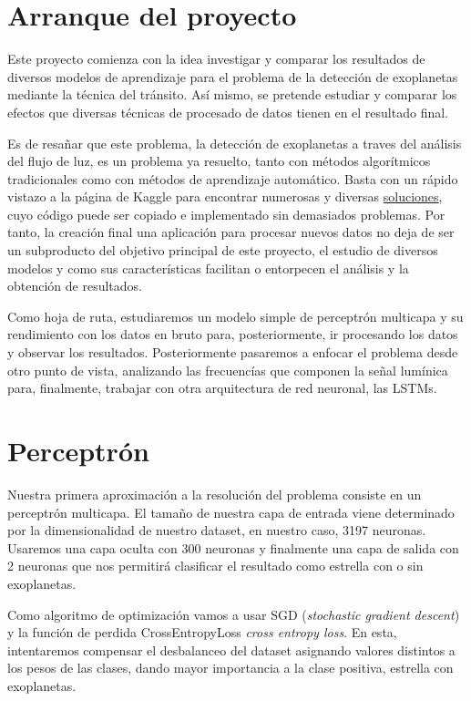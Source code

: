 
\section{Arranque del proyecto}

Este proyecto comienza con la idea investigar y comparar los resultados de diversos modelos de aprendizaje para el problema de la detección de exoplanetas mediante la técnica del tránsito. Así mismo, se pretende estudiar y comparar los efectos que diversas técnicas de procesado de datos tienen en el resultado final.

Es de resañar que este problema, la detección de exoplanetas a traves del análisis del flujo de luz, es un problema ya resuelto, tanto con métodos algorítmicos tradicionales como con métodos de aprendizaje automático. Basta con un rápido vistazo a la página de Kaggle para encontrar numerosas y diversas \href{https://www.kaggle.com/keplersmachines/kepler-labelled-time-series-data/kernels}{soluciones}, cuyo código puede ser copiado e implementado sin demasiados problemas. Por tanto, la creación final una aplicación para procesar nuevos datos no deja de ser un subproducto del objetivo principal de este proyecto, el estudio de diversos modelos y como sus características facilitan o entorpecen el análisis y la obtención de resultados.

Como hoja de ruta, estudiaremos un modelo simple de perceptrón multicapa y su rendimiento con los datos en bruto para, posteriormente, ir procesando los datos y observar los resultados. Posteriormente pasaremos a enfocar el problema desde otro punto de vista, analizando las frecuencías que componen la señal lumínica para, finalmente, trabajar con otra arquitectura de red neuronal, las LSTMs.

\section{Perceptrón}

Nuestra primera aproximación a la resolución del problema consiste en un perceptrón multicapa. El tamaño de nuestra capa de entrada viene determinado por la dimensionalidad de nuestro dataset, en nuestro caso, 3197 neuronas. Usaremos una capa oculta con 300 neuronas y finalmente una capa de salida con 2 neuronas que nos permitirá clasificar el resultado como estrella con o sin exoplanetas.

Como algoritmo de optimización vamos a usar SGD (\textit{stochastic gradient descent}) y la función de perdida CrossEntropyLoss \textit{cross entropy loss}. En esta, intentaremos compensar el desbalanceo del dataset asignando valores distintos a los pesos de las clases, dando mayor importancia a la clase positiva, estrella con exoplanetas.

